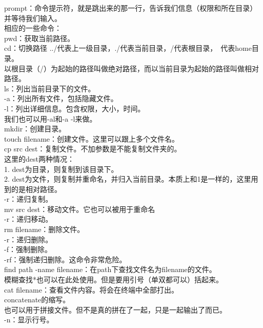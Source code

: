 \documentclass{article}
\begin{document}
\noindent
prompt：命令提示符，就是跳出来的那一行，告诉我们信息（权限和所在目录）并等待我们输入。\\

\noindent
相应的一些命令：\\
pwd：获取当前路径。\\
cd：切换路径 ../代表上一级目录，./代表当前目录，/代表根目录，~代表home目录。\\
以根目录（/）为起始的路径叫做绝对路径，而以当前目录为起始的路径叫做相对路径。\\

\noindent
ls：列出当前目录下的文件。\\
\qquad -a：列出所有文件，包括隐藏文件。\\
\qquad -l：列出详细信息。包含权限，大小，时间。\\
\qquad 我们也可以用-al和-a -l来做。\\

\noindent
mkdir：创建目录。\\
touch filename：创建文件。这里可以跟上多个文件名。\\

\noindent
cp src dest：复制文件。不加参数是不能复制文件夹的。\\
这里的dest两种情况：\\
1. dest为目录，则复制到该目录下。\\
2. dest为文件，则复制并重命名，并归入当前目录。本质上和1是一样的，这里用到的是相对路径。\\
\qquad -r：递归复制。\\

\noindent
mv src dest：移动文件。它也可以被用于重命名\\
\qquad -r：递归移动。\\

\noindent
rm filename：删除文件。\\
\qquad -r：递归删除。\\
\qquad -f：强制删除。\\
\qquad -rf：强制递归删除。这命令非常危险。\\

\noindent
find path -name filename：在path下查找文件名为filename的文件。\\
\qquad 模糊查找*也可以在此处使用。但是要用引号（单双都可以）括起来。\\

\noindent
cat filename：查看文件内容。将会在终端中全部打出。\\
\qquad *concatenate的缩写。\\
\qquad 也可以用于拼接文件。但不是真的拼在了一起，只是一起输出了而已。\\
\qquad -n：显示行号。\\
\end{document}
